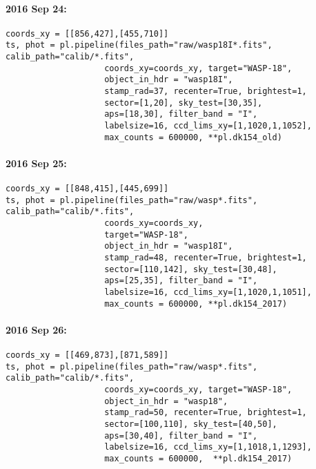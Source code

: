 \paragraph*{2016 Sep 24:}
\begin{verbatim}
coords_xy = [[856,427],[455,710]]
ts, phot = pl.pipeline(files_path="raw/wasp18I*.fits", calib_path="calib/*.fits",
                    coords_xy=coords_xy, target="WASP-18",
                    object_in_hdr = "wasp18I",
                    stamp_rad=37, recenter=True, brightest=1,
                    sector=[1,20], sky_test=[30,35],
                    aps=[18,30], filter_band = "I",
                    labelsize=16, ccd_lims_xy=[1,1020,1,1052],
                    max_counts = 600000, **pl.dk154_old)
\end{verbatim}

\paragraph*{2016 Sep 25:}
\begin{verbatim}
coords_xy = [[848,415],[445,699]]
ts, phot = pl.pipeline(files_path="raw/wasp*.fits", calib_path="calib/*.fits",
                    coords_xy=coords_xy,
                    target="WASP-18",
                    object_in_hdr = "wasp18I",
                    stamp_rad=48, recenter=True, brightest=1,
                    sector=[110,142], sky_test=[30,48],
                    aps=[25,35], filter_band = "I",
                    labelsize=16, ccd_lims_xy=[1,1020,1,1051],
                    max_counts = 600000, **pl.dk154_2017)
\end{verbatim}

\paragraph*{2016 Sep 26:}
\begin{verbatim}
coords_xy = [[469,873],[871,589]]
ts, phot = pl.pipeline(files_path="raw/wasp*.fits", calib_path="calib/*.fits",
                    coords_xy=coords_xy, target="WASP-18",
                    object_in_hdr = "wasp18",
                    stamp_rad=50, recenter=True, brightest=1,
                    sector=[100,110], sky_test=[40,50],
                    aps=[30,40], filter_band = "I",
                    labelsize=16, ccd_lims_xy=[1,1018,1,1293],
                    max_counts = 600000,  **pl.dk154_2017)
\end{verbatim}

